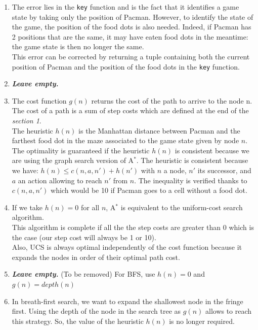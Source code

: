 \documentclass{article}
\begin{document}
\begin{enumerate}[label=\alph*.,leftmargin=1.35em]
    \item The error lies in the \texttt{key} function and is the fact that it identifies a game state by taking only the position of Pacman. However, to identify the state of the game, the position of the food dots is also needed. Indeed, if Pacman has 2 positions that are the same, it may have eaten food dots in the meantime: the game state is then no longer the same.\\
          This error can be corrected by returning a tuple containing both the current position of Pacman and the position of the food dots in the \texttt{key} function.  
    \item \textbf{{\it Leave empty.}}
    \item The cost function $g(n)$ returns the cost of the path to arrive to the node n. The cost of a path is a sum of step costs which are defined at the end of the \textit{section 1}.\\
    The heuristic $h(n)$ is the Manhattan distance between Pacman and the farthest food dot in the maze associated to the game state given by node $n$.\\
    The optimality is guaranteed if the heuristic $h(n)$ is consistent because we are using the graph search version of A$^*$. The heuristic is consistent because we have: $h(n) \leq c(n,a,n') + h(n')$ with $n$ a node, $n'$ its successor, and $a$ an action allowing to reach $n'$ from $n$. The inequality is verified thanks to $c(n,a,n')$ which would be 10 if Pacman goes to a cell without a food dot.
    \item If we take $h(n) = 0$ for all $n$, A$^*$ is equivalent to the uniform-cost search algorithm.\\
    This algorithm is complete if all the the step costs are greater than 0 which is the case (our step cost will always be 1 or 10).\\
    Also, UCS is always optimal independently of the cost function because it expands the nodes in order of their optimal path cost.
    \item \textbf{{\it Leave empty.}} (To be removed) For BFS, use $h(n) = 0$ and $g(n) = depth(n)$
    \item In breath-first search, we want to expand the shallowest node in the fringe first. Using the depth of the node in the search tree as $g(n)$ allows to reach this strategy. So, the value of the heuristic $h(n)$ is no longer required.
\end{enumerate}
\end{document}
